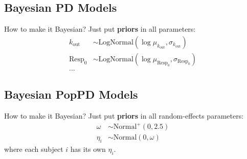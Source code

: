 \subsection{Bayesian PD Models}
\begin{frame}{How to make it Bayesian?}
    Just put \textbf{priors} in all parameters:
    $$
        \begin{aligned}
            k_{\text{out}} & \sim \text{LogNormal}(\log{\mu_{k_{\text{out}}}}, \sigma_{k_{\text{out}}}) \\
            \text{Resp}_0  & \sim \text{LogNormal}(\log{\mu_{\text{Resp}_0}}, \sigma_{\text{Resp}_0})   \\
            \ldots
        \end{aligned}
    $$
\end{frame}

\subsection{Bayesian PopPD Models}
\begin{frame}{How to make it Bayesian?}
    Just put \textbf{priors} in all random-effects parameters:
    $$
        \begin{aligned}
            \omega   & \sim \text{Normal}^+(0, 2.5)  \\
            \eta_{i} & \sim \text{Normal}(0, \omega)
        \end{aligned}
    $$
    \vfill
    where each subject $i$ has its own $\eta_i$.
\end{frame}